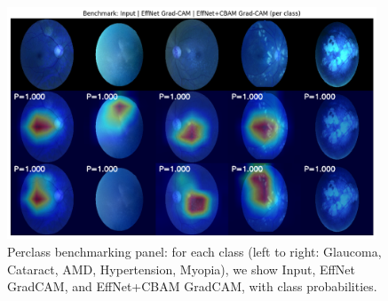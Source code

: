 \begin{figure}[t]
  \centering
  \includegraphics[width=0.98\textwidth]{../new_work/figures/gradcam_benchmark_panel.png}
  \caption{Per\textendash class benchmarking panel: for each class (left to right: Glaucoma, Cataract, AMD, Hypertension, Myopia), we show Input, EffNet Grad\textendash CAM, and EffNet+CBAM Grad\textendash CAM, with class probabilities.}
  \label{fig:gradcam_panel}
\end{figure}

